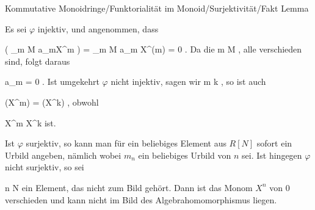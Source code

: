 {Kommutative Monoidringe/Funktorialität im Monoid/Surjektivität/Fakt}
{Lemma}
{}
{



\faktsituation {}
\faktzusatz {}
\faktzusatz {}





}
{





Es sei $\varphi$ injektiv, und angenommen, dass

\mavergleichskettedisp
{\vergleichskette
{ \tilde{\varphi} \left(  \sum_{m \in M} a_mX^m  \right)
}
{ =} { \sum_{m \in M} a_m X^{\varphi(m)}
}
{ =} { 0
}
{ } {
}
{ } {
}
}
{}{}{.}
Da die  { m \in M   }{,} alle verschieden sind, folgt daraus

\mavergleichskette
{\vergleichskette
{a_m
}
{ = }{ 0
}
{  }{
}
{    }{
}
{   }{
}
}
{}{}{.}
Ist umgekehrt $\varphi$ nicht injektiv, sagen wir  {  m \neq k }{,} so ist auch

\mavergleichskette
{\vergleichskette
{ \tilde{\varphi} (X^m)
}
{ = }{ \tilde{\varphi} (X^k)
}
{  }{
}
{    }{
}
{   }{
}
}
{}{}{,}
obwohl

\mavergleichskette
{\vergleichskette
{ X^m
}
{ \neq }{ X^k
}
{  }{
}
{    }{
}
{   }{
}
}
{}{}{}
ist.

Ist $\varphi$ surjektiv, so kann man für ein beliebiges Element
 aus $R[N]$ sofort ein Urbild angeben, nämlich
 wobei $m_n$ ein beliebiges Urbild von $n$ sei. Ist hingegen $\varphi$ nicht surjektiv, so sei

\mavergleichskette
{\vergleichskette
{ n
}
{ \in }{ N
}
{  }{
}
{    }{
}
{   }{
}
}
{}{}{}
ein Element, das nicht zum Bild gehört. Dann ist das Monom $X^n$ von $0$ verschieden und kann nicht im Bild des Algebrahomomorphismus liegen.




}







